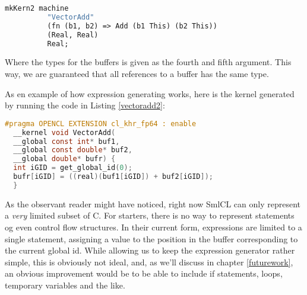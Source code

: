\begin{lstlisting}[mathescape,language=ML,caption=Expressing VectorAdd
  using SmlCLs expression generating capabilities.,label=vectoradd2]
  mkKern2 machine
          "VectorAdd"
          (fn (b1, b2) => Add (b1 This) (b2 This))
          (Real, Real)
          Real;
\end{lstlisting}

Where the types for the buffers is given as the fourth and fifth
argument. This way, we are guaranteed that all references to a buffer
has the same type.

As en example of how expression generating works, here is the kernel
generated by running the code in Listing \ref{vectoradd2}:

\begin{lstlisting}[mathescape,language=C,caption=VectorAdd as
    generated by SmlCL]
  #pragma OPENCL EXTENSION cl_khr_fp64 : enable
  __kernel void VectorAdd(
  __global const int* buf1,
  __global const double* buf2,
  __global double* bufr) {
  int iGID = get_global_id(0);
  bufr[iGID] = ((real)(buf1[iGID]) + buf2[iGID]);
  }
\end{lstlisting}

As the observant reader might have noticed, right now SmlCL can only
represent a \emph{very} limited subset of C. For starters, there is no
way to represent statements og even control flow structures. In their
current form, expressions are limited to a single statement, assigning
a value to the position in the buffer corresponding to the current
global id. While allowing us to keep the expression generator rather
simple, this is obviously not ideal, and, as we'll discuss in chapter
\ref{futurework}, an obvious improvement would be to be able to
include if statements, loops, temporary variables and the
like.
